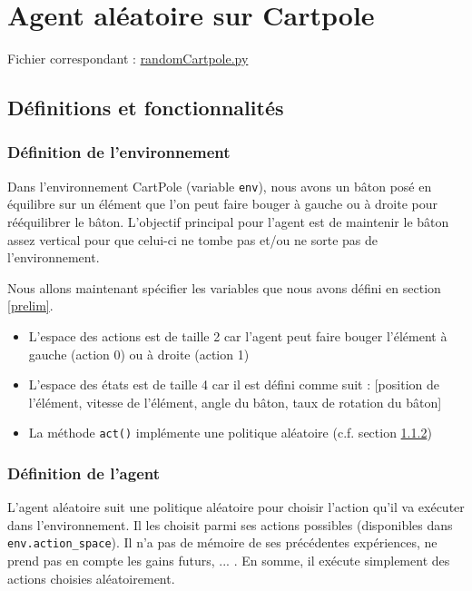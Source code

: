 \documentclass[10pt,a4paper]{article}
\begin{document}

\section{Agent aléatoire sur Cartpole}

Fichier correspondant : \href{https://github.com/NellyBarret/IA5-TP-APR/blob/master/randomCartPole.py}{randomCartpole.py}

\subsection{Définitions et fonctionnalités}
\subsubsection{Définition de l'environnement}
Dans l'environnement CartPole (variable \lstinline{env}), nous avons un bâton posé en équilibre sur un élément que l'on peut faire bouger à gauche ou à droite pour rééquilibrer le bâton. L'objectif principal pour l'agent est de maintenir le bâton assez vertical pour que celui-ci ne tombe pas et/ou ne sorte pas de l'environnement.

Nous allons maintenant spécifier les variables que nous avons défini en section \ref{prelim}.
\begin{itemize}
	\item L'espace des actions est de taille 2 car l'agent peut faire bouger l'élément à gauche (action 0) ou à droite (action 1)
	\item L'espace des états est de taille 4 car il est défini comme suit : [position de l'élément, vitesse de l'élément, angle du bâton, taux de rotation du bâton]
	\item La méthode \lstinline{act()} implémente une politique aléatoire (c.f. section \ref{defAgentRand})
\end{itemize}

\subsubsection{Définition de l'agent} \label{defAgentRand}
L'agent aléatoire suit une politique aléatoire pour choisir l'action qu'il va exécuter dans l'environnement. Il les choisit parmi ses actions possibles (disponibles dans \lstinline{env.action_space}). Il n'a pas de mémoire de ses précédentes expériences, ne prend pas en compte les gains futurs, ... . En somme, il exécute simplement des actions choisies aléatoirement.
\end{document}
